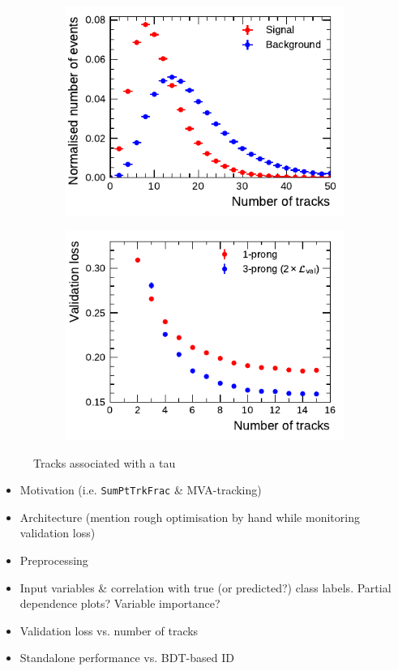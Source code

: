 \begin{figure}[ht]
  \begin{subfigure}[t]{0.48\textwidth}
    \centering
    \includegraphics{./figures/rnn/ntrk_1p.pdf}
  \end{subfigure}\hfill
  \begin{subfigure}[t]{0.48\textwidth}
    \centering
    \includegraphics{./figures/rnn/nscan/track_1p_3p.pdf}
  \end{subfigure}
  \caption{Tracks associated with a tau}
  \label{fig:rnn_ntracks}
\end{figure}

\begin{itemize}
\item Motivation (i.e. \texttt{SumPtTrkFrac} \& MVA-tracking)
\item Architecture (mention rough optimisation by hand while monitoring
  validation loss)
\item Preprocessing
\item Input variables \& correlation with true (or predicted?) class labels.
  Partial dependence plots? Variable importance?
\item Validation loss vs. number of tracks
\item Standalone performance vs. BDT-based ID
\end{itemize}

